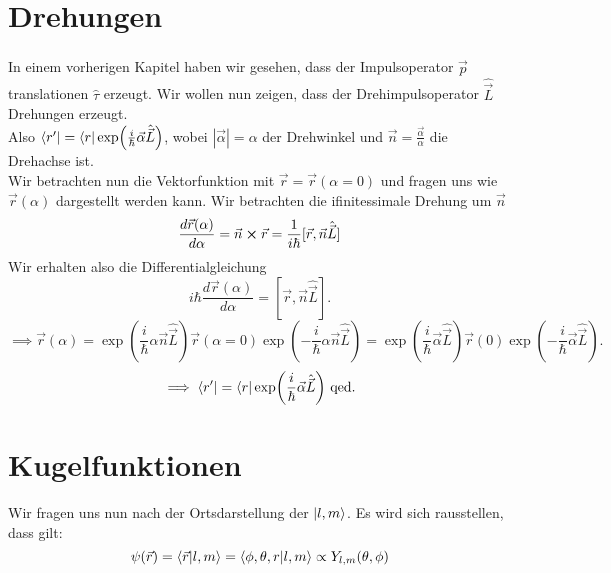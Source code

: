 \documentclass{report}
\begin{document}
\section{Drehungen}
In einem vorherigen Kapitel haben wir gesehen, dass der Impulsoperator $\hat{\vec{p}}$ translationen $\hat{\tau}$ erzeugt. Wir wollen nun zeigen, dass der Drehimpulsoperator $\hat{\vec{L}}$ Drehungen erzeugt.\\
Also $\bra{r'} = \bra{r} \exp(\frac{i}{\hbar} \vec{\alpha} \hat{\vec{L}})$, wobei $|\vec{\alpha}| = \alpha$ der Drehwinkel und $\vec{n} = \frac{\vec{\alpha}}{\alpha}$ die Drehachse ist.\\
Wir betrachten nun die Vektorfunktion mit $\vec{r} = \vec{r}(\alpha = 0)$ und fragen uns wie $\vec{r}(\alpha)$ dargestellt werden kann. Wir betrachten die ifinitessimale Drehung um $\vec{n}$  \[
	\frac{d\vec{r}(\alpha)}{d\alpha} = \vec{n} \cross \vec{r} = \frac{1}{i\hbar } [\vec{r}, \vec{n} \hat{\vec{L}}]
\] Wir erhalten also die Differentialgleichung \[
i\hbar \frac{d\vec{r}(\alpha)}{d\alpha} = [\vec{r}, \vec{n} \hat{\vec{L}}]
.\] \[
\implies \vec{r}(\alpha) = \exp(\frac{i}{\hbar} \alpha \vec{n} \hat{\vec{L}}) \vec{r}(\alpha = 0) \exp(-\frac{i}{\hbar } \alpha \vec{n} \hat{\vec{L}}) = \exp(\frac{i}{\hbar } \vec{\alpha} \hat{\vec{L}}) \vec{r}(0) \exp(-\frac{i}{\hbar } \vec{\alpha} \hat{\vec{L}})
.\] \[
\implies \bra{r'} = \bra{r} \exp(\frac{i}{\hbar } \vec{\alpha} \hat{\vec{L}}) \text{  qed.}
\]  
\section{Kugelfunktionen}
Wir fragen uns nun nach der Ortsdarstellung der $\ket{l,m} $. Es wird sich rausstellen, dass gilt: \[
	\psi(\vec{r}) = \bra{\vec{r} }\ket{l,m} = \bra{\phi, \theta, r} \ket{l,m} \propto Y_{l,m}(\theta, \phi)
\] 
\end{document}
